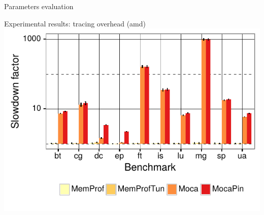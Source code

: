 \documentclass[xcolor={usenames,dvipsnames},hyperref={pdfusetitle}]{beamer}
\begin{document}
\setcounter{framenumber}{\value{finalframe}}
\begin{frame}{Parameters evaluation}
    \pause
\end{frame}


\setcounter{framenumber}{\value{finalframe}}
\begin{frame}{Experimental results: tracing overhead (amd)}
        \includegraphics[width=\linewidth]{moca/moca_overhead_amd.pdf}
\end{frame}
\end{document}
